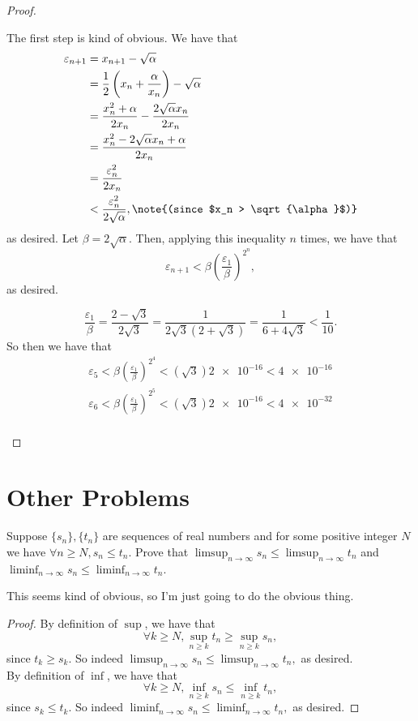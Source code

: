 \documentclass{assignment}
\begin{document}
\begin{proof}
\begin{qparts}
  \item The first step is kind of obvious. We have that
    \begin{align*}
      \varepsilon_{n+1} &= x_{n+1} - \sqrt{\alpha} \\
                        &= \frac{1}{2}\left( x_n + \frac{\alpha}{x_n} \right) - \sqrt{\alpha} \\
                        &= \frac{x^2_n + \alpha}{2x_n} - \frac{2\sqrt{\alpha}x_n}{2x_n} \\
                        &= \frac{x_n^2 - 2\sqrt{\alpha}x_n + \alpha}{2x_n} \\
                        &= \frac{\varepsilon_n^2}{2x_n} \\
                        &< \frac{\varepsilon_n^2}{2\sqrt{\alpha}}, \note{(since $x_n >
    \sqrt{\alpha}$)}
    \end{align*}
    as desired. Let $\beta = 2\sqrt{\alpha}$. Then, applying this inequality $n$ times, we have that 
    $$\varepsilon_{n+1} < \beta \left( \frac{\varepsilon_1}{\beta} \right)^{2^n},$$ as desired.

  \item $$\frac{\varepsilon_1}{\beta} = \frac{2 - \sqrt{3}}{2\sqrt{3}} = \frac{1}{2\sqrt{3}(2 +
    \sqrt{3})} = \frac{1}{6 + 4\sqrt{3}} < \frac{1}{10}.$$ So then we have that 
      \begin{gather*}
        \varepsilon_5 < \beta \left( \frac{\varepsilon_1}{\beta} \right)^{2^4} < (\sqrt{3})\num{2e-16} 
        < \num{4e-16} \\
        \varepsilon_6 < \beta \left( \frac{\varepsilon_1}{\beta} \right)^{2^5} < (\sqrt{3})\num{2e-16}
        < \num{4e-32} \\
      \end{gather*}

\end{qparts}
\end{proof}

\section*{Other Problems}
\begin{question}[1]
  Suppose $\{s_n\}, \{t_n\}$ are sequences of real numbers and for some positive integer $N$ we have 
$\forall n \geq N, s_n \leq t_n$. Prove that $\limsup_{n\to\infty} s_n \leq \limsup_{n\to\infty} t_n$
and $\liminf_{n\to\infty} s_n \leq \liminf_{n\to\infty} t_n$.  
\end{question}
This seems kind of obvious, so I'm just going to do the obvious thing.
\begin{proof}
  By definition of $\sup$, we have that $$\forall k \geq N, \sup_{n\geq k} t_n \geq
  \sup_{n\geq k} s_n,$$ since $t_k \geq s_k$. So indeed $\limsup_{n\to\infty}s_n \leq
  \limsup_{n\to\infty}t_n,$ as desired. \\

  By definition of $\inf$, we have that $$\forall k \geq N, \inf_{n\geq k} s_n \leq
  \inf_{n\geq k} t_n,$$ since $s_k \leq t_k$. So indeed $\liminf_{n\to\infty}s_n \leq
  \liminf_{n\to\infty}t_n,$ as desired.
\end{proof}
\end{document}
